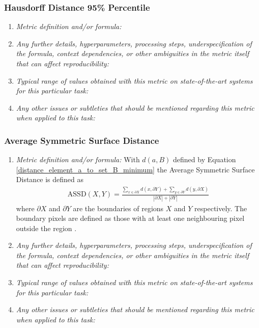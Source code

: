 \documentclass[a4paper,11pt]{article}
\begin{document}
        \subsubsection{Hausdorff Distance 95\% Percentile}
            \begin{enumerate}[label=\alph*.]
                \item \textit{Metric definition and/or formula:}
                \bigskip
                \item \textit{Any further details, hyperparameters, processing steps, underspecification of the formula, context dependencies, or other ambiguities in the metric itself that can affect reproducibility:}
                \bigskip
                \item \textit{Typical range of values obtained with this metric on state-of-the-art systems for this particular task:}
                \bigskip
                \item \textit{Any other issues or subtleties that should be mentioned regarding this metric when applied to this task:}
                \bigskip
            \end{enumerate}
        \subsubsection{Average Symmetric Surface Distance}
            \begin{enumerate}[label=\alph*.]
                \item \textit{Metric definition and/or formula:}
                With $d(a,B)$ defined by Equation \ref{distance_element_a_to_set_B_minimum} the Average Symmetric Surface Distance is defined as
                \begin{align}
                    \textrm{ASSD}(X, Y) = \frac{\sum\limits_{x \in \partial X} d(x,\partial Y) + \sum\limits_{y \in \partial Y} d(y, \partial X)}{\left| \partial X \right| + \left| \partial Y \right|}
                \end{align}
                where $\partial X$ and $\partial Y$ are the boundaries of regions $X$ and $Y$ respectively. The boundary pixels are defined as those with at least one neighbouring pixel outside the region \cite{yeghiazaryan2018family}.

                \bigskip
                \item \textit{Any further details, hyperparameters, processing steps, underspecification of the formula, context dependencies, or other ambiguities in the metric itself that can affect reproducibility:}
                \bigskip
                \item \textit{Typical range of values obtained with this metric on state-of-the-art systems for this particular task:}
                \bigskip
                \item \textit{Any other issues or subtleties that should be mentioned regarding this metric when applied to this task:}
                \bigskip
            \end{enumerate}
\end{document}

